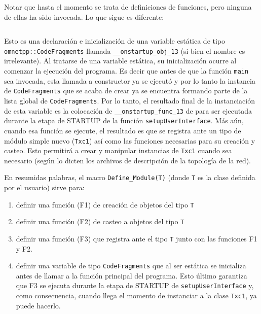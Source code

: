 \documentclass[]{article}
\begin{document}
Notar que hasta el momento se trata de definiciones de funciones, pero ninguna
de ellas ha sido invocada. Lo que sigue es diferente:

\inputminted{c++}{codelistings/define_module_4.cc}

Esto es una declaración e inicialización de una variable estática de tipo
\verb!omnetpp::CodeFragments! llamada \verb!__onstartup_obj_13! (si bien el
nombre es irrelevante). Al tratarse de una variable estática, su inicialización
ocurre al comenzar la ejecución del programa. Es decir que antes de que la
función \verb!main! sea invocada, esta llamada a constructor ya se ejecutó y
por lo tanto la instancia de \verb!CodeFragments! que se acaba de crear ya se
encuentra formando parte de la lista global de \verb!CodeFragments!. Por lo
tanto, el resultado final de la instanciación de esta variable es la colocación
de \verb!__onstartup_func_13!  de para ser ejecutada durante la etapa de
STARTUP de la función \verb!setupUserInterface!. Más aún, cuando esa función se
ejecute, el resultado es que se registra ante \omnetpp{} un tipo de módulo
simple nuevo (\verb!Txc1!) así como las funciones necesarias para su creación y
casteo. Esto permitirá a \omnetpp{} crear y manipular instancias de \verb!Txc1!
cuando sea necesario (según lo dicten los archivos de descripción de la
topología de la red).

En resumidas palabras, el macro \verb!Define_Module(T)!  (donde \verb!T! es la
clase definida por el usuario) sirve para:

\begin{enumerate}
    \item definir una función (F1) de creación de objetos del tipo \verb!T!

    \item definir una función (F2) de casteo a objetos del tipo \verb!T!

    \item definir una función (F3) que registra ante \omnetpp{} el tipo
\verb!T! junto con las funciones F1 y F2.

    \item definir una variable de tipo \verb!CodeFragments! que al ser estática
se inicializa antes de llamar a la función principal del programa. Esto último
garantiza que F3 se ejecuta durante la etapa de STARTUP de
\verb!setupUserInterface! y, como consecuencia, cuando llega el momento de
instanciar a la clase \verb!Txc1!, \omnetpp{} ya puede hacerlo.

\end{enumerate}
\end{document}
